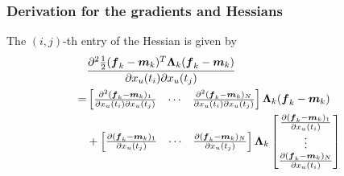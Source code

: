 \begin{frame}[t]
    \frametitle{Derivation for the gradients and Hessians}
    The $(i, j)$-th entry of the Hessian is given by
    \begin{align}
        &\frac{
            \partial^{2}\frac{1}{2}(\boldsymbol{f}_{k}-\boldsymbol{m}_{k})^T\boldsymbol{\Lambda}_{k}(\boldsymbol{f}_{k}-\boldsymbol{m}_{k})}{
            \partial x_{u}(t_{i})\partial x_{u}(t_{j})}
        \nonumber
        \\
        = & \begin{bmatrix}
            \frac{\partial^2(\boldsymbol{f}_{k}-\boldsymbol{m}_{k})_1}{\partial x_{u}(t_{i})\partial x_{u}(t_{j})}
            &
            \cdots
            &
            \frac{\partial^2(\boldsymbol{f}_{k}-\boldsymbol{m}_{k})_N}{\partial x_{u}(t_{i})\partial x_{u}(t_{j})}
        \end{bmatrix}
        \boldsymbol{\Lambda}_{k}(\boldsymbol{f}_{k}-\boldsymbol{m}_{k}) 
        \nonumber
        \\
        & + 
        \begin{bmatrix}
            \frac{\partial(\boldsymbol{f}_{k}-\boldsymbol{m}_{k})_1}{\partial x_{u}(t_{j})}
            &
            \cdots
            &
            \frac{\partial(\boldsymbol{f}_{k}-\boldsymbol{m}_{k})_N}{\partial x_{u}(t_{j})}
        \end{bmatrix}
        \boldsymbol{\Lambda}_{k}
        \begin{bmatrix}
            \frac{\partial(\boldsymbol{f}_{k}-\boldsymbol{m}_{k})_1}{\partial x_{u}(t_{i})}
            \\
            \vdots
            \\
            \frac{\partial(\boldsymbol{f}_{k}-\boldsymbol{m}_{k})_N}{\partial x_{u}(t_{i})}
        \end{bmatrix}
    \end{align}
\end{frame}

